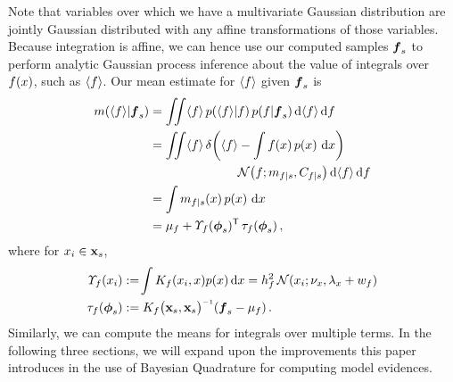 \documentclass{article}
\begin{document}
Note that variables over which we have a multivariate Gaussian distribution are jointly Gaussian distributed with any affine transformations of those variables. Because integration is affine, we can hence use our computed samples $\vf_s$ to perform analytic Gaussian process inference about the value of integrals over $f(\lfv)$, such as $\inty{f}$. Our mean estimate for $\inty{f}$ given $\vf_s$ is
%
\begin{align} \label{eq:mean_inty_f}
\mean{\inty{f}}{\vf_s}
& 
=\iint \inty{f}\,\p{\inty{f}}{f}\p{f}{\vf_s} \ud \inty{f} \,\ud f                                                                                                                                                               \nonumber\\
&
 =\iint \inty{f}\,\dd{\inty{f}}{\int f(\lfv)\,\po{\lfv}\,\ud\lfv}
\nonumber\\
&\hspace{2.5cm}
\N{f}{\meancondfn{f}{s}}{C_{f|s}} \ud \inty{f} \,\ud f \nonumber\\
&
 = \int \meancondfn{f}{s}(\lfv)\,\po{\lfv}\,\ud\lfv\nonumber\\
&
 = 
\mu_f + \ntT{s}{f}\, \dtt{s}{f}
\,,
\end{align}
where for $\lfv_i \in \vlfv_s$,
\begin{align*}
\fnt{\lfv_i}{f} & \deq \!\int K_f(\lfv_i,\lfv)\po{\lfv}\ud\lfv
 = h_f^2\,\N{\lfv_i}{\nu_{\lfv}}{\lambda_{\lfv}+w_{f}}\\
\dtt{s}{f} & \deq K_{f}\bigl(\vlfv_s,\vlfv_s\bigr)\inv (\vf_s-{\mu}_{f})\,.
\end{align*}
%
%
Similarly, we can compute the means for integrals over multiple terms. In the following three sections, we will expand upon the improvements this paper introduces in the use of Bayesian Quadrature for computing model evidences.
\end{document}
